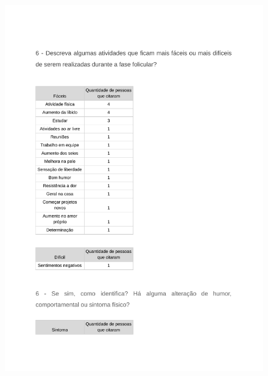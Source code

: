 \begin{apendicesenv}
        \begin{figure}[ht]
            \centering
            \includegraphics[keepaspectratio=true,scale=0.7]{figuras/Tab19.pdf}
        \end{figure}
        

\end{apendicesenv}
